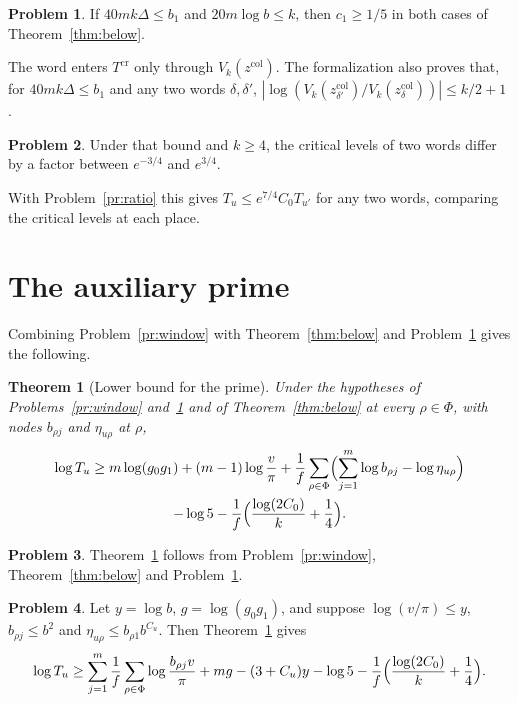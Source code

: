 \documentclass[reqno]{amsart}
\theoremstyle{definition}
\newtheorem{problem}{Problem}[section]
\theoremstyle{plain}
\newtheorem{theorem}{Theorem}[section]
\theoremstyle{remark}
\newcommand{\Tc}{T^{\mathrm{cr}}}
\newcommand{\zc}{z^{\mathrm{col}}}
\begin{document}
\begin{problem}\label{pr:c1}
If $40mk\Delta\le b_1$ and $20m\log b\le k$, then $c_1\ge1/5$ in both
cases of Theorem~\ref{thm:below}.
\end{problem}

The word enters $\Tc$ only through $V_k(\zc)$.  The formalization also
proves that, for $40mk\Delta\le b_1$ and any two words $\delta,\delta'$,
$|\log(V_k(\zc_{\delta'})/V_k(\zc_\delta))|\le k/2+1$ \cite{Lean}.

\begin{problem}\label{pr:words}
Under that bound and $k\ge4$, the critical levels of two words differ by
a factor between $e^{-3/4}$ and $e^{3/4}$.
\end{problem}

With Problem~\ref{pr:ratio} this gives $T_u\le e^{7/4}C_0T_{u'}$ for any
two words, comparing the critical levels at each place.

\section{The auxiliary prime}\label{sec:A6}

Combining Problem~\ref{pr:window} with Theorem~\ref{thm:below} and
Problem~\ref{pr:c1} gives the following.

\begin{theorem}[Lower bound for the prime]\label{thm:A6}
Under the hypotheses of Problems~\ref{pr:window} and~\ref{pr:c1} and of
Theorem~\ref{thm:below} at every $\rho\in\Phi$, with nodes $b_{\rho j}$
and $\eta_{u\rho}$ at $\rho$,
\begin{multline*}
 \log T_u\ge m\log(g_0g_1)+(m-1)\log\frac v\pi
 +\frac1f\sum_{\rho\in\Phi}\Bigl(\sum_{j=1}^m\log b_{\rho j}
 -\log\eta_{u\rho}\Bigr)\\
 -\log5-\frac1f\Bigl(\frac{\log(2C_0)}k+\frac14\Bigr).
\end{multline*}
\end{theorem}

\begin{problem}\label{pr:A6}
Theorem~\ref{thm:A6} follows from Problem~\ref{pr:window},
Theorem~\ref{thm:below} and Problem~\ref{pr:c1}.
\end{problem}

\begin{problem}\label{pr:compare}
Let $y=\log b$, $g=\log(g_0g_1)$, and suppose $\log(v/\pi)\le y$,
$b_{\rho j}\le b^2$ and $\eta_{u\rho}\le b_{\rho1}b^{C_u}$.  Then
Theorem~\ref{thm:A6} gives
\[
 \log T_u\ge\sum_{j=1}^m\frac1f\sum_{\rho\in\Phi}
 \log\frac{b_{\rho j}v}{\pi}+mg-(3+C_u)y-\log5
 -\frac1f\Bigl(\frac{\log(2C_0)}k+\frac14\Bigr).
\]
\end{problem}
\end{document}
